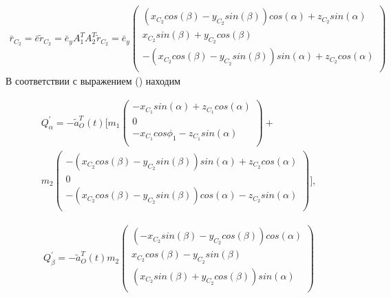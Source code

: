 \begin{equation} %
\label{eq:p3:31}
\begin{multlined}
\bar{r}_{C_{2}}=\bar{e}\tilde{r}_{C_{2}}=\bar{e}_{y}A_{1}^{T}A_{2}^{T}\tilde{r}_{C_{2}}=\bar{e}_{y} \left( \begin{matrix}
\left( x_{C_{2}}cos \left(  \beta  \right) -y_{C_{2}}sin \left(  \beta  \right)  \right) cos \left(  \alpha  \right) +z_{C_{2}}sin \left(  \alpha  \right) \\
x_{C_{2}}sin \left(  \beta  \right) +y_{C_{2}}cos \left(  \beta  \right) \\
- \left( x_{C_{2}}cos \left(  \beta  \right) -y_{C_{2}}sin \left(  \beta  \right)  \right) sin \left(  \alpha  \right) +z_{C_{2}}cos \left(  \alpha  \right) \\
\end{matrix}
\right) 
\end{multlined}
\end{equation}
В соответствии с выражением () находим

\begin{equation} %
\label{eq:p3:32}
\begin{multlined}
Q_{ \alpha }^{'}=
-\tilde{a}_{O}^{T} ( t )  
[    
m_{1} \left(  
\begin{matrix}
	-x_{C_{1}}sin (  \alpha  ) +z_{C_{1}}cos (  \alpha  ) \\
	0\\
	-x_{C_{1}}cos \phi _{1}-z_{C_{1}}sin (  \alpha  ) \\
\end{matrix}
\right)  + \\ 
 m_{2} 
\left(   
\begin{matrix}
	- ( x_{C_{2}}cos (  \beta  ) -y_{C_{2}}sin (  \beta  )  ) sin (  \alpha  ) +z_{C_{2}}cos (  \alpha  ) \\
	0 \\
	- ( x_{C_{2}}cos (  \beta  ) -y_{C_{2}}sin (  \beta  )  ) cos (  \alpha  ) -z_{C_{2}}sin (  \alpha  ) \\
\end{matrix} 
\right)   
]      ,
\end{multlined}
\end{equation}

\begin{equation} %
\label{eq:p3:33}
\begin{multlined}
Q_{ \beta }^{'}=-\tilde{a}_{O}^{T} \left( t \right) m_{2} \left( \begin{matrix}
\left( -x_{C_{2}}sin \left(  \beta  \right) -y_{C_{2}}cos \left(  \beta  \right)  \right) cos \left(  \alpha  \right) \\
x_{C_{2}}cos \left(  \beta  \right) -y_{C_{2}}sin \left(  \beta  \right) \\
\left( x_{C_{2}}sin \left(  \beta  \right) +y_{C_{2}}cos \left(  \beta  \right)  \right) sin \left(  \alpha  \right) \\
\end{matrix}
\right) 
\end{multlined}
\end{equation}

